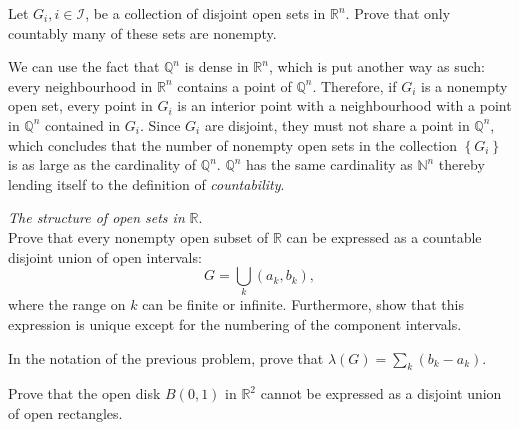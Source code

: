 \documentclass[answers]{exam}
\begin{document}
\begin{questions}
\begin{solution}
   \end{solution}

   \begin{solution}

   \end{solution}

   \begin{solution}

   \end{solution}

   \begin{solution}

   \end{solution}
   \question
   Let $G_{i}, i \in \mathcal{I}$, be a collection of disjoint open sets in $\mathbb{R}^{n}$. Prove that only countably many of these sets are nonempty.
   \begin{solution}
      We can use the fact that $\mathbb{Q}^{n}$ is dense in $\mathbb{R}^{n}$, which is put another way as such: every neighbourhood in $\mathbb{R}^{n}$ contains a point of $\mathbb{Q}^{n}$. Therefore, if $G_{i}$ is a nonempty open set, every point in $G_{i}$ is an interior point with a neighbourhood with a point in $\mathbb{Q}^{n}$ contained in $G_{i}$. Since $G_{i}$ are disjoint, they must not share a point in $\mathbb{Q}^{n}$, which concludes that the number of nonempty open sets in the collection $\left\{G_{i}\right\}$ is as large as the cardinality of $\mathbb{Q}^{n}$. $\mathbb{Q}^{n}$ has the same cardinality as $\mathbb{N}^{n}$ thereby lending itself to the definition of \emph{countability}. 
   \end{solution}
   \question
   \emph{The structure of open sets in} $\mathbb{R}$.\\
   Prove that every nonempty open subset of $\mathbb{R}$ can be expressed as a countable disjoint union of open intervals:
   $$
      G = \bigcup\limits_{k} \left(a_{k}, b_{k}\right),
   $$
   where the range on $k$ can be finite or infinite. Furthermore, show that this expression is unique except for the numbering of the component intervals.
   \begin{solution}

   \end{solution}
   \question
   In the notation of the previous problem, prove that $\lambda\left(G\right) = \sum_{k} \left(b_{k}-a_{k}\right)$.
   \begin{solution}

   \end{solution}
   \question
   Prove that the open disk $B\left(0,1\right)$ in $\mathbb{R}^{2}$ cannot be expressed as a disjoint union of open rectangles.
   \begin{solution}


\end{solution}
\end{questions}
\end{document}
